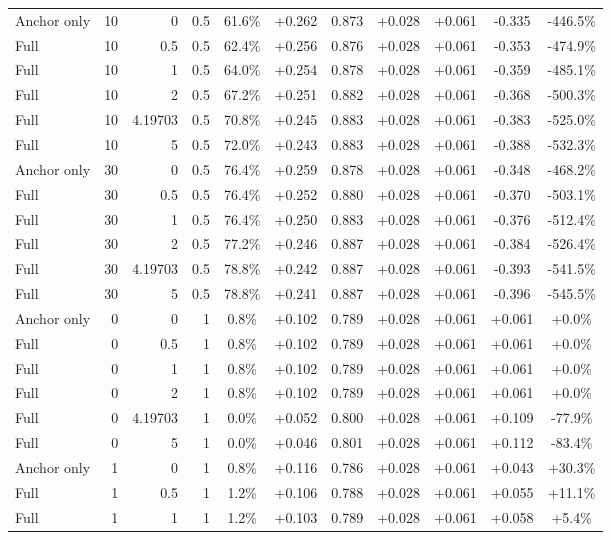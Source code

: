 \begin{table}[htbp]
\begin{tabular}{lrrrccccccc}
Anchor only & 10 & 0 & 0.5 & 61.6\% & +0.262 & 0.873 & +0.028 & +0.061 & -0.335 & -446.5\% \\
Full & 10 & 0.5 & 0.5 & 62.4\% & +0.256 & 0.876 & +0.028 & +0.061 & -0.353 & -474.9\% \\
Full & 10 & 1 & 0.5 & 64.0\% & +0.254 & 0.878 & +0.028 & +0.061 & -0.359 & -485.1\% \\
Full & 10 & 2 & 0.5 & 67.2\% & +0.251 & 0.882 & +0.028 & +0.061 & -0.368 & -500.3\% \\
Full & 10 & 4.19703 & 0.5 & 70.8\% & +0.245 & 0.883 & +0.028 & +0.061 & -0.383 & -525.0\% \\
Full & 10 & 5 & 0.5 & 72.0\% & +0.243 & 0.883 & +0.028 & +0.061 & -0.388 & -532.3\% \\
Anchor only & 30 & 0 & 0.5 & 76.4\% & +0.259 & 0.878 & +0.028 & +0.061 & -0.348 & -468.2\% \\
Full & 30 & 0.5 & 0.5 & 76.4\% & +0.252 & 0.880 & +0.028 & +0.061 & -0.370 & -503.1\% \\
Full & 30 & 1 & 0.5 & 76.4\% & +0.250 & 0.883 & +0.028 & +0.061 & -0.376 & -512.4\% \\
Full & 30 & 2 & 0.5 & 77.2\% & +0.246 & 0.887 & +0.028 & +0.061 & -0.384 & -526.4\% \\
Full & 30 & 4.19703 & 0.5 & 78.8\% & +0.242 & 0.887 & +0.028 & +0.061 & -0.393 & -541.5\% \\
Full & 30 & 5 & 0.5 & 78.8\% & +0.241 & 0.887 & +0.028 & +0.061 & -0.396 & -545.5\% \\
Anchor only & 0 & 0 & 1 & 0.8\% & +0.102 & 0.789 & +0.028 & +0.061 & +0.061 & +0.0\% \\
Full & 0 & 0.5 & 1 & 0.8\% & +0.102 & 0.789 & +0.028 & +0.061 & +0.061 & +0.0\% \\
Full & 0 & 1 & 1 & 0.8\% & +0.102 & 0.789 & +0.028 & +0.061 & +0.061 & +0.0\% \\
Full & 0 & 2 & 1 & 0.8\% & +0.102 & 0.789 & +0.028 & +0.061 & +0.061 & +0.0\% \\
Full & 0 & 4.19703 & 1 & 0.0\% & +0.052 & 0.800 & +0.028 & +0.061 & +0.109 & -77.9\% \\
Full & 0 & 5 & 1 & 0.0\% & +0.046 & 0.801 & +0.028 & +0.061 & +0.112 & -83.4\% \\
Anchor only & 1 & 0 & 1 & 0.8\% & +0.116 & 0.786 & +0.028 & +0.061 & +0.043 & +30.3\% \\
Full & 1 & 0.5 & 1 & 1.2\% & +0.106 & 0.788 & +0.028 & +0.061 & +0.055 & +11.1\% \\
Full & 1 & 1 & 1 & 1.2\% & +0.103 & 0.789 & +0.028 & +0.061 & +0.058 & +5.4\% \\

\end{tabular}
\end{table}
